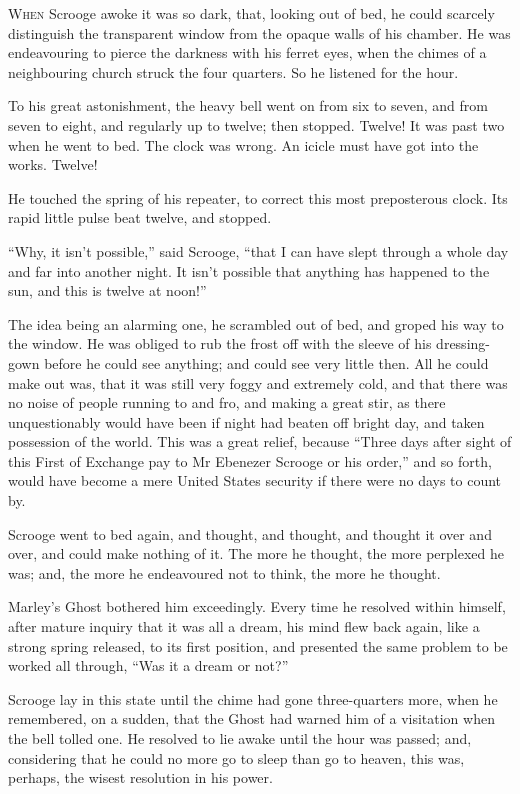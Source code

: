 \documentclass[paper=5.5in:8.5in,BCOR=5mm,twoside,DIV=calc,12pt,usegeometry]{scrbook} %
\begin{document}
\lettrine[loversize=.85]{W}{hen} Scrooge awoke it was so dark, that, looking out of bed, he could scarcely distinguish the transparent window from the opaque walls of his chamber. He was endeavouring to pierce the darkness with his ferret eyes, when the chimes of a neighbouring church struck the four quarters. So he listened for the hour.

To his great astonishment, the heavy bell went on from six to seven, and from seven to eight, and regularly up to twelve; then stopped. Twelve! It was past two when he went to bed. The clock was wrong. An icicle must have got into the works. Twelve!

He touched the spring of his repeater, to correct this most preposterous clock. Its rapid little pulse beat twelve, and stopped.

\enquote{Why, it isn't possible,} said Scrooge, \enquote{that I can have slept through a whole day and far into another night. It isn't possible that anything has happened to the sun, and this is twelve at noon!}

The idea being an alarming one, he scrambled out of bed, and groped his way to the window. He was obliged to rub the frost off with the sleeve of his dressing-gown before he could see anything; and could see very little then. All he could make out was, that it was still very foggy and extremely cold, and that there was no noise of people running to and fro, and making a great stir, as there unquestionably would have been if night had beaten off bright day, and taken possession of the world. This was a great relief, because \enquote{Three days after sight of this First of Exchange pay to Mr Ebenezer Scrooge or his order,} and so forth, would have become a mere United States security if there were no days to count by.

Scrooge went to bed again, and thought, and thought, and thought it over and over, and could make nothing of it. The more he thought, the more perplexed he was; and, the more he endeavoured not to think, the more he thought.

Marley's Ghost bothered him exceedingly. Every time he resolved within himself, after mature inquiry that it was all a dream, his mind flew back again, like a strong spring released, to its first position, and presented the same problem to be worked all through, \enquote{Was it a dream or not?}

Scrooge lay in this state until the chime had gone three-quarters more, when he remembered, on a sudden, that the Ghost had warned him of a visitation when the bell tolled one. He resolved to lie awake until the hour was passed; and, considering that he could no more go to sleep than go to heaven, this was, perhaps, the wisest resolution in his power.
\end{document}

